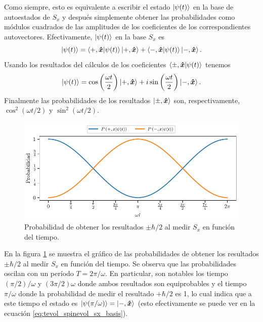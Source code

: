 \documentclass[10pt, a4paper]{article}
\newcommand{\wt}{\omega t}
\numberwithin{equation}{subsection}
\begin{document}
Como siempre, esto es equivalente a escribir el estado $\ket{\psi(t)}$ en la
base de autoestados de $S_x$ y después simplemente obtener las probabilidades 
como módulos cuadrados de las amplitudes de los coeficientes de los
correspondientes autovectores. Efectivamente, $\ket{\psi(t)}$ en la base $S_x$
es
\begin{equation}
  \ket{\psi(t)} = \braket{+,\vu*{x}}{\psi(t)}\ket{+,\vu*{x}} +
                  \braket{-,\vu*{x}}{\psi(t)}\ket{-,\vu*{x}}.
\end{equation}
Usando los resultados del cálculos de los coeficientes
$\braket{\pm,\vu*{x}}{\psi(t)}$ tenemos
\begin{equation} \label{eq:tevol_spinevol_sx_basis}
  \ket{\psi(t)} = \cos\left(\frac{\wt}{2}\right)\ket{+,\vers{x}} +
                 i\sin\left(\frac{\wt}{2}\right)\ket{-,\vers{x}}.
\end{equation}
Finalmente las probabilidades de los resultados $\ket{\pm,\vu*{x}}$ son,
respectivamente, $\cos^2(\wt/2)$ y $\sin^2(\wt/2)$.

\begin{figure}[tb]
  \centering
  \includegraphics{images/spinevol_prob_sx.pdf}
  \caption{Probabilidad de obtener los resultados $\pm\hbar/2$ al medir $S_x$
    en función del tiempo.\label{fig:prob_sx_t}}
\end{figure}

En la figura \ref{fig:prob_sx_t} se muestra el gráfico de las probabilidades de
obtener los resultados $\pm\hbar/2$ al medir $S_x$ en función del tiempo. Se
observa que las probabilidades oscilan con un período $T = 2\pi / \omega$. En
particular, son notables los tiempo $(\pi/2)/\omega$ y $(3\pi/2)\omega$ donde
ambos resultados son equiprobables y el tiempo $\pi / \omega$ donde la
probabilidad de medir el resultado $+\hbar/2$ es 1, lo cual indica que a este
tiempo el estado es $\ket{\psi(\pi/\omega)} = \ket{-,\vu*{x}}$ (esto
efectivamente se puede ver en la ecuación \eqref{eq:tevol_spinevol_sx_basis}).
\end{document}
